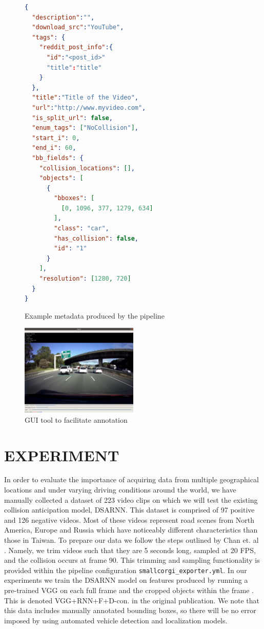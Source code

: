 \documentclass[letterpaper, 10 pt, conference]{ieeeconf}
\begin{document}
\begin{figure}
  \begin{lstlisting}[language=json,xleftmargin=5mm]
{
  "description":"",
  "download_src":"YouTube",
  "tags": {
    "reddit_post_info":{
      "id":"<post_id>"
      "title":"title"
    }
  },
  "title":"Title of the Video",
  "url":"http://www.myvideo.com",
  "is_split_url": false,
  "enum_tags": ["NoCollision"],
  "start_i": 0,
  "end_i": 60,
  "bb_fields": {
    "collision_locations": [],
    "objects": [
      {
        "bboxes": [
          [0, 1096, 377, 1279, 634]
        ],
        "class": "car",
        "has_collision": false,
        "id": "1"
      }
    ],
    "resolution": [1280, 720]
  }
}
  \end{lstlisting}
    \caption{Example metadata produced by the pipeline}
    \label{metadata_example}
\end{figure}

\begin{figure}[htpb]
		\centering
    \includegraphics[width=0.5\textwidth]{example_gui_tool.png}
		\caption{GUI tool to facilitate annotation}
		\label{fig:example_gui_tool-png}
\end{figure}

\section{EXPERIMENT}

In order to evaluate the importance of acquiring data from multiple geographical locations and under varying driving conditions around the world, we have manually collected a dataset of 223 video clips on which we will test the existing collision anticipation model, DSARNN. This dataset is comprised of 97 positive and 126 negative videos. Most of these videos represent road scenes from North America, Europe and Russia which have noticeably different characteristics than those in Taiwan. To prepare our data we follow the steps outlined by Chan et. al \cite{chan2016anticipating}. Namely, we trim videos such that they are 5 seconds long, sampled at 20 FPS, and the collision occurs at frame 90. This trimming and sampling functionality is provided within the pipeline configuration \texttt{smallcorgi\_exporter.yml}. In our experiments we train the DSARNN model on features produced by running a pre-trained VGG on each full frame and the cropped objects within the frame \cite{DBLP:journals/corr/SimonyanZ14a}. This is denoted VGG+RNN+F+D-con. in the original publication. We note that this data includes manually annotated bounding boxes, so there will be no error imposed by using automated vehicle detection and localization models.
\end{document}

